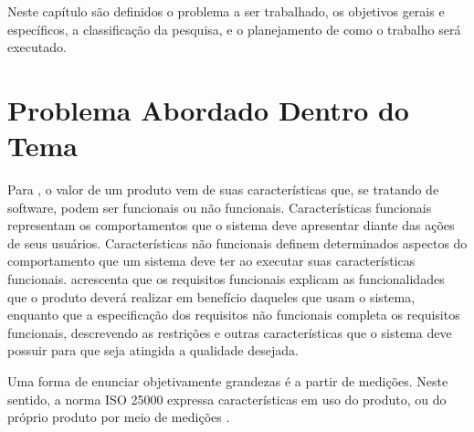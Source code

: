 Neste capítulo são definidos o problema a ser trabalhado, os objetivos gerais e específicos, a classificação da pesquisa, e o planejamento de como o trabalho será executado.

\section{Problema Abordado Dentro do Tema}
\label{probl}

%
Para , o valor de um produto vem de suas características que, se tratando de software, podem ser funcionais ou não funcionais. Características funcionais representam os comportamentos que o sistema deve apresentar diante das ações de seus usuários. Características não funcionais definem determinados aspectos do comportamento que um sistema deve ter ao executar suas características funcionais.  acrescenta que os requisitos funcionais explicam as funcionalidades que o produto deverá realizar em benefício daqueles que usam o sistema, enquanto que a especificação dos requisitos não funcionais completa os requisitos funcionais, descrevendo as restrições e outras características que o sistema deve possuir para que seja atingida a qualidade desejada.

%
Uma forma de enunciar objetivamente grandezas é a partir de medições. Neste sentido, a norma ISO 25000 expressa características em uso do produto, ou do próprio produto por meio de medições \cite{iso_25000}. 
%

